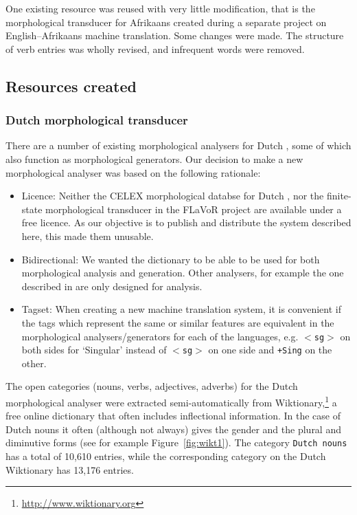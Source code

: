 \documentclass[11pt]{article}
\begin{document}
One existing resource was reused with very little modification, that is the 
morphological transducer for Afrikaans created during a separate project on English--Afrikaans
machine translation. Some changes were made. The structure of verb entries
was wholly revised, and infrequent words were removed.

\subsection{Resources created}

\subsubsection{Dutch morphological transducer}

There are a number of existing morphological analysers for Dutch \cite{Bosch:07,Laureys:04,DePauw:04},
some of which also function as morphological generators. Our decision to make a new morphological 
analyser was based on the following rationale:

\begin{itemize}
\item Licence: Neither the CELEX morphological databse for Dutch \cite{Laureys:04},
    nor the finite-state morphological transducer in the FLaVoR project \cite{DePauw:04}
    are available under a free licence. As our objective is to publish and distribute 
    the system described here, this made them unusable.
\item Bidirectional: We wanted the dictionary to be able to be used for both
    morphological analysis and generation. Other analysers, for example the 
    one described in  are only designed for analysis.
\item Tagset: When creating a new machine translation system, it is convenient
    if the tags which represent the same or similar features are equivalent in the 
    morphological analysers/generators for each of the languages,
    e.g. {\small {\tt $<$sg$>$}} on both sides for `Singular' instead 
    of {\small {\tt $<$sg$>$}} on one side and {\small {\tt +Sing}} on 
    the other.
\end{itemize}

The open categories (nouns, verbs, adjectives, adverbs) for the Dutch 
morphological analyser were extracted semi-automatically from 
Wiktionary,\footnote{\url{http://www.wiktionary.org}} a free online 
dictionary that often includes inflectional information. In the case 
of Dutch nouns it often (although not always) gives the gender and the 
plural and diminutive forms (see for example Figure~\ref{fig:wikt1}).
The category {\small {\tt Dutch nouns}} has a total of 10,610 entries,
while the corresponding category on the Dutch Wiktionary has 13,176 entries.
\end{document}
